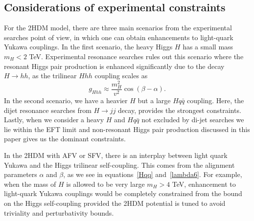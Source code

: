 
\subsection{Considerations of experimental constraints}
For the 2HDM model, there are three main scenarios from the experimental searches point of view, in which one can obtain enhancements to light-quark Yukawa couplings. In the first scenario, the heavy Higgs $H$ has a small mass~$m_H <2$ TeV. Experimental resonance searches rules out this scenario where the resonant Higgs pair production is enhanced significantly due to the decay~$ H\to hh$, as the trilinear $Hhh$ coupling scales as~\cite{Egana-Ugrinovic:2021uew}
\begin{equation}
	g_{Hhh}\approx \frac{m_H^2}{v^2} \cos(\beta-\alpha).
\end{equation}
In the second scenario, we have a heavier $H$ but a large $Hq\bar{q}$ coupling. Here, the dijet resonance searches from $H\to jj$ decay, provides the strongest constraints. Lastly, when we consider a heavy $H$ and $Hq\bar{q}$  not excluded by di-jet searches we lie within the EFT limit and non-resonant Higgs pair production discussed in this paper gives us the dominant constraints.

In the 2HDM with AFV or SFV, there is an interplay between light quark Yukawa and the Higgs trilinear self-coupling. This comes from the alignment parameters $\alpha$ and $\beta$, as we see in equations~\eqref{Hqq} and~\eqref{lambda6}. For example, when the mass of $H$ is allowed to be very large $m_H >4$ TeV, enhancement to light-quark Yukawa couplings would be completely constrained from the bound on the Higgs self-coupling provided the 2HDM potential is tuned to avoid triviality and perturbativity bounds. 

